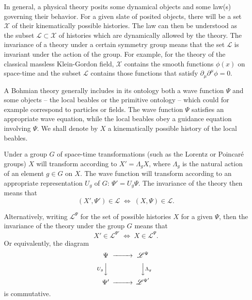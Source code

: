 \documentclass[12pt]{article}
\def\pa{\partial}
\begin{document}
In general, a physical theory posits some dynamical objects
and some law(s) governing their behavior.  For a given slate of
posited objects, there will be a set $\mathscr{X}$ of their
kinematically possible histories.  The law can then be understood as the subset $\mathscr{L} \subset
\mathscr{X}$ of histories which
are dynamically allowed by the theory. 
The invariance of a theory under a certain symmetry group
means that the set $\mathscr{L}$ is invariant under
the action of the group. For example, for the theory of the
classical massless Klein-Gordon field, $\mathscr{X}$ contains the smooth functions $\phi(x)$ on space-time and the subset $\mathscr{L}$ contains those functions that satisfy $\pa_\mu \pa^\mu \phi =0$.

A Bohmian theory generally includes in its ontology both a wave function $\Psi$ and some
objects -- the local beables or the primitive ontology --
which could for example correspond to particles or fields.  The wave
function $\Psi$ satisfies an appropriate wave equation, while the
local beables obey a guidance equation involving $\Psi$. We shall denote by $X$ a kinematically possible history of the local beables.  

Under a group $G$ of space-time transformations (such as the Lorentz
or Poincar\'e groups) $X$ will transform  
according to $X' = \Lambda_g X$, where $\Lambda_g$ is the natural
action of an element $g \in G$ on $X$.  The 
wave function will transform according to an appropriate 
representation $U_g$ of $G$:  $\Psi' = U_g \Psi$.  The invariance of the theory then means
that
\begin{equation}
\left( X', \Psi' \right) \in {\mathscr{L}} \;  \Longleftrightarrow \; \left( X,
  \Psi \right) \in {\mathscr{L}} .
\end{equation}

Alternatively, writing $\mathscr{L}^\Psi$ for the set of possible
histories $X$ for a given $\Psi$, then the invariance of the theory
under the group $G$ means that
\begin{equation}
X' \in \mathscr{L}^{\Psi'}
\;  \Longleftrightarrow \; X \in \mathscr{L}^\Psi.
\end{equation}
Or equivalently, the diagram 
\begin{equation}
 \CD
\Psi{}    @>>>    {\mathscr{L}}^\Psi{}\\
@VU_gVV         @VV \Lambda_{g} V\\
\Psi{}'  @>>>    {\mathscr{L}}^{\Psi{}'}
\endCD
\end{equation}
is commutative. 
\end{document}
